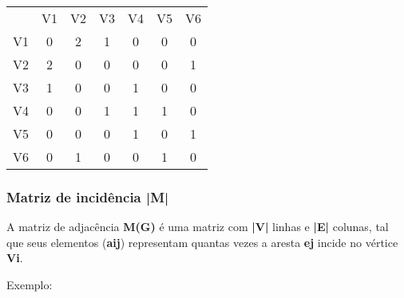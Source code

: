 \documentclass[a4paper, 12pt]{article}
\begin{document}
    \begin{multicols}{2}
        
        \begin{tabular}{ccccccc}
                & V1 & V2 & V3 & V4 & V5 & V6 \\
                V1 & 0  & 2  & 1  & 0  & 0  & 0  \\
                V2 & 2  & 0  & 0  & 0  & 0  & 1  \\
                V3 & 1  & 0  & 0  & 1  & 0  & 0  \\
                V4 & 0  & 0  & 1  & 1  & 1  & 0  \\
                V5 & 0  & 0  & 0  & 1  & 0  & 1  \\
                V6 & 0  & 1  & 0  & 0  & 1  & 0 
        \end{tabular}
        
    \end{multicols}
    
\subsubsection{Matriz de incidência |M|}

    A matriz de adjacência \textbf{M(G)} é uma matriz com \textbf{|V|} linhas e \textbf{|E|} colunas, tal que seus elementos (\textbf{aij}) representam quantas vezes a aresta \textbf{ej} incide no vértice \textbf{Vi}.
    
    \vspace{0.5in}
    
    Exemplo:
    
\end{document}
